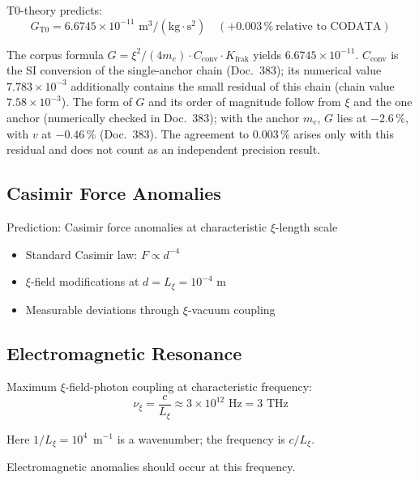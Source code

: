 	T0-theory predicts:
	\begin{equation}
		G_{\text{T0}} = 6.6745 \times 10^{-11} \text{ m}^3/(\text{kg} \cdot \text{s}^2) \quad (+0.003\,\%\ \text{relative to CODATA})
	\end{equation}
	
	The corpus formula $G = \xi^2/(4m_e)\cdot C_{\text{conv}}\cdot K_{\text{frak}}$ yields $6.6745\times10^{-11}$. $C_{\text{conv}}$ is the SI conversion of the single-anchor chain (Doc.~383); its numerical value $7.783\times10^{-3}$ additionally contains the small residual of this chain (chain value $7.58\times10^{-3}$). The form of $G$ and its order of magnitude follow from $\xi$ and the one anchor (numerically checked in Doc.~383); with the anchor $m_e$, $G$ lies at $-2.6\,\%$, with $v$ at $-0.46\,\%$ (Doc.~383). The agreement to $0.003\,\%$ arises only with this residual and does not count as an independent precision result.
	
	\subsection{Casimir Force Anomalies}
	
	\begin{experiment}
		Prediction: Casimir force anomalies at characteristic $\xi$-length scale
		\begin{itemize}
			\item Standard Casimir law: $F \propto d^{-4}$
			\item $\xi$-field modifications at $d = L_\xi = 10^{-4}$ m
			\item Measurable deviations through $\xi$-vacuum coupling
		\end{itemize}
	\end{experiment}
	
	\subsection{Electromagnetic Resonance}
	
	Maximum $\xi$-field-photon coupling at characteristic frequency:
	\begin{equation}
		\nu_\xi = \frac{c}{L_\xi} \approx 3 \times 10^{12} \text{ Hz} = 3 \text{ THz}
	\end{equation}

	Here $1/L_\xi = 10^4$~m$^{-1}$ is a wavenumber; the frequency is $c/L_\xi$.
	
	Electromagnetic anomalies should occur at this frequency.
	

